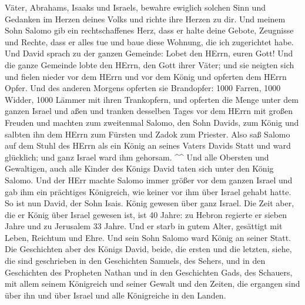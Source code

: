 Väter, Abrahams, Isaaks und Israels, bewahre ewiglich solchen Sinn und
Gedanken im Herzen deines Volks und richte ihre Herzen zu dir.
 Und meinem Sohn Salomo gib ein rechtschaffenes Herz, dass
er halte deine Gebote, Zeugnisse und Rechte, dass er alles tue und baue
diese Wohnung, die ich zugerichtet habe.  Und David sprach
zu der ganzen Gemeinde: Lobet den HErrn, euren Gott! Und die ganze
Gemeinde lobte den HErrn, den Gott ihrer Väter; und sie neigten sich und
fielen nieder vor dem HErrn und vor dem König  und opferten
dem HErrn Opfer. Und des anderen Morgens opferten sie Brandopfer: 1000
Farren, 1000 Widder, 1000 Lämmer mit ihren Trankopfern, und opferten die
Menge unter dem ganzen Israel  und aßen und tranken
desselben Tages vor dem HErrn mit großen Freuden und machten zum
zweitenmal Salomo, den Sohn Davids, zum König und salbten ihn dem HErrn
zum Fürsten und Zadok zum Priester.  Also saß Salomo auf
dem Stuhl des HErrn als ein König an seines Vaters Davids Statt und ward
glücklich; und ganz Israel ward ihm gehorsam. \^{}\^{}  Und
alle Obersten und Gewaltigen, auch alle Kinder des Königs David taten
sich unter den König Salomo.  Und der HErr machte Salomo
immer größer vor dem ganzen Israel und gab ihm ein prächtiges
Königreich, wie keiner vor ihm über Israel gehabt hatte. 
So ist nun David, der Sohn Isais. König gewesen über ganz Israel.
 Die Zeit aber, die er König über Israel gewesen ist, ist
40 Jahre: zu Hebron regierte er sieben Jahre und zu Jerusalem 33 Jahre.
 Und er starb in gutem Alter, gesättigt mit Leben, Reichtum
und Ehre. Und sein Sohn Salomo ward König an seiner Statt. 
Die Geschichten aber des Königs David, beide, die ersten und die
letzten, siehe, die sind geschrieben in den Geschichten Samuels, des
Sehers, und in den Geschichten des Propheten Nathan und in den
Geschichten Gads, des Schauers,  mit allem seinem
Königreich und seiner Gewalt und den Zeiten, die ergangen sind über ihn
und über Israel und alle Königreiche in den Landen.
